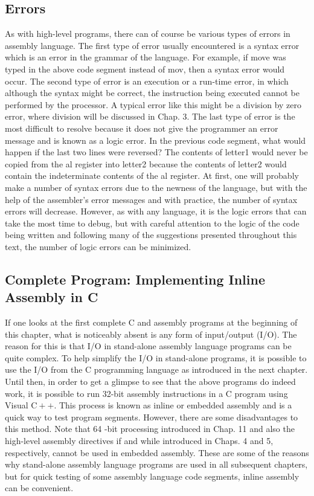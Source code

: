 \documentclass[10pt]{article}
\begin{document}
\subsection*{Errors}
As with high-level programs, there can of course be various types of errors in assembly language. The first type of error usually encountered is a syntax error which is an error in the grammar of the language. For example, if move was typed in the above code segment instead of mov, then a syntax error would occur. The second type of error is an execution or a run-time error, in which although the syntax might be correct, the instruction being executed cannot be performed by the processor. A typical error like this might be a division by zero error, where division will be discussed in Chap. 3. The last type of error is the most difficult to resolve because it does not give the programmer an error message and is known as a logic error. In the previous code segment, what would happen if the last two lines were reversed? The contents of letter1 would never be copied from the al register into letter2 because the contents of letter2 would contain the indeterminate contents of the al register. At first, one will probably make a number of syntax errors due to the newness of the language, but with the help of the assembler's error messages and with practice, the number of syntax errors will decrease. However, as with any language, it is the logic errors that can take the most time to debug, but with careful attention to the logic of the code being written and following many of the suggestions presented throughout this text, the number of logic errors can be minimized.

\subsection*{Complete Program: Implementing Inline Assembly in C}
If one looks at the first complete C and assembly programs at the beginning of this chapter, what is noticeably absent is any form of input/output (I/O). The reason for this is that I/O in stand-alone assembly language programs can be quite complex. To help simplify the I/O in stand-alone programs, it is possible to use the I/O from the C programming language as introduced in the next chapter. Until then, in order to get a glimpse to see that the above programs do indeed work, it is possible to run 32-bit assembly instructions in a C program using Visual $\mathrm{C}++$. This process is known as inline or embedded assembly and is a quick way to test program segments. However, there are some disadvantages to this method. Note that 64 -bit processing introduced in Chap. 11 and also the high-level assembly directives if and while introduced in Chaps. 4 and 5, respectively, cannot be used in embedded assembly. These are some of the reasons why stand-alone assembly language programs are used in all subsequent chapters, but for quick testing of some assembly language code segments, inline assembly can be convenient.
\end{document}

